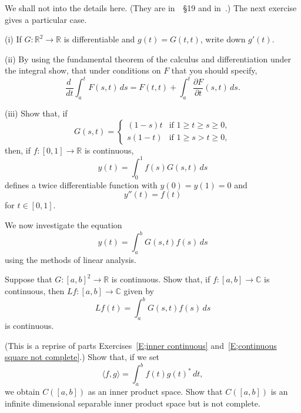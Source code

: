 We shall not into the details here. (They are in~\cite{Pryce}~\S19
and in~\cite{Young}.)
The next exercise gives a particular case.
\begin{exercise}\label{E;Green sine}\label{D1} 
(i) If $G:{\mathbb R}^{2}\rightarrow{\mathbb R}$
is differentiable and $g(t)=G(t,t)$, write down $g'(t)$.

(ii) By using the fundamental theorem of the calculus
and differentiation under the integral show, that under
conditions on $F$ that you should specify,
\[\frac{d\ }{dt}\int_{a}^{t}F(s,t)\,ds
=F(t,t)+\int_{a}^{t}\frac{\partial F}{\partial t}(s,t)\,ds.\]

(iii) Show that, if
\[G(s,t)=
\begin{cases}(1-s)t&\text{if $1\geq t\geq s\geq 0$},\\
s(1-t)&\text{if $1\geq s>t\geq 0$},
\end{cases}\]
then, if $f:[0,1]\rightarrow{\mathbb R}$ is continuous,
\[y(t)=\int_{0}^{1}f(s)G(s,t)\,ds\]
defines a twice differentiable function with $y(0)=y(1)=0$ and
\[y''(t)=f(t)\]
for $t\in[0,1]$.
\end{exercise}

We now investigate the equation
\[y(t)=\int_{a}^{b}G(s,t)f(s)\,ds\]
using the methods of linear analysis.
\begin{exercise}\label{D2} Suppose that $G:[a,b]^{2}\rightarrow{\mathbb R}$
is continuous. Show that, if $f:[a,b]\rightarrow{\mathbb C}$
is continuous, then $Lf:[a,b]\rightarrow{\mathbb C}$ given by
\[Lf(t)=\int_{a}^{b}G(s,t)f(s)\,ds\]
is continuous.
\end{exercise}
\begin{exercise}\label{D3} (This is a reprise
of parts Exercises~\ref{E;inner continuous}
and~\ref{E;continuous square not complete}.)
Show that, if we set
\[\langle f,g\rangle=\int_{a}^{b}f(t)g(t)^{*}\,dt,\]
we obtain $C([a,b])$ as an inner product space.
Show that $C([a,b])$ is an infinite dimensional
separable inner product space but is not complete.
\end{exercise}


